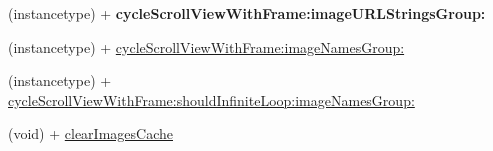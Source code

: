 \begin{DoxyCompactItemize}
\item 
\mbox{\label{interface_s_d_cycle_scroll_view_aa143023eb03f1e7d5d2c6fc273a06ec9}} 
(instancetype) + {\bfseries cycle\+Scroll\+View\+With\+Frame\+:image\+U\+R\+L\+Strings\+Group\+:}
\item 
(instancetype) + \mbox{\hyperlink{interface_s_d_cycle_scroll_view_a575db2e230e7e594b027bade1634d25d}{cycle\+Scroll\+View\+With\+Frame\+:image\+Names\+Group\+:}}
\item 
(instancetype) + \mbox{\hyperlink{interface_s_d_cycle_scroll_view_a71e89750df3ca82d3e1eef99e44ddce3}{cycle\+Scroll\+View\+With\+Frame\+:should\+Infinite\+Loop\+:image\+Names\+Group\+:}}
\item 
(void) + \mbox{\hyperlink{interface_s_d_cycle_scroll_view_a85146f335fd4ff38783b358530ad130f}{clear\+Images\+Cache}}
\end{DoxyCompactItemize}
